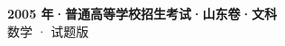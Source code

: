 \documentclass[zihao=-4, a4paper]{ctexart}
\begin{document}
\begin{center}
  {\Large\bfseries 2005 年·普通高等学校招生考试·山东卷·文科}\\[4pt]
  {\large 数学 · 试题版}
\end{center}
\medskip
{}

\end{document}
